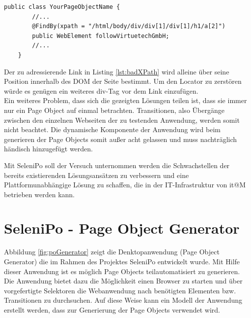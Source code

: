 \begin{lstlisting}[caption={Einfacher XPath-Locator des Projektes OHMAP},label={lst:badXPath}]
	public class YourPageObjectName {
		//...		
 		@FindBy(xpath = "/html/body/div/div[1]/div[1]/h1/a[2]")
		public WebElement followVirtuetechGmbH;	
		//...
	}
\end{lstlisting}

Der zu adressierende Link in  Listing \ref{lst:badXPath} wird alleine über seine Position innerhalb des DOM der Seite bestimmt.
Um den Locator zu zerstören würde es genügen ein weiteres div-Tag vor dem Link einzufügen.
\\
Ein weiteres Problem, dass sich die gezeigten Lösungen teilen ist, dass sie immer nur ein Page Object auf einmal betrachten. Transitionen, also Übergänge zwischen den einzelnen Webseiten der zu testenden Anwendung, werden somit nicht beachtet. Die dynamische Komponente der Anwendung wird beim generieren der Page Objects somit außer acht gelassen und muss nachträglich händisch hinzugefügt werden.

Mit SeleniPo soll der Versuch unternommen werden die Schwachstellen der bereits existierenden Lösungsansätzen zu verbessern und eine Plattformunabhängige Lösung zu schaffen, die in der IT-Infrastruktur von it@M betrieben werden kann.

\newpage
\section{SeleniPo - Page Object Generator}
\label{sec:selenipo_pogenerator}

Abbildung \ref{fig:poGenerator} zeigt die Denktopanwendung (Page Object Generator) die im Rahmen des Projektes SeleniPo entwickelt wurde. Mit Hilfe dieser Anwendung ist es möglich Page Objects teilautomatisiert zu generieren. Die Anwendung bietet dazu die Möglichkeit einen Browser zu starten und über vorgefertigte Selektoren die Webanwendung nach benötigten Elementen bzw. Transitionen zu durchsuchen. Auf diese Weise kann ein Modell der Anwendung erstellt werden, dass zur Generierung der Page Objects verwendet wird.


